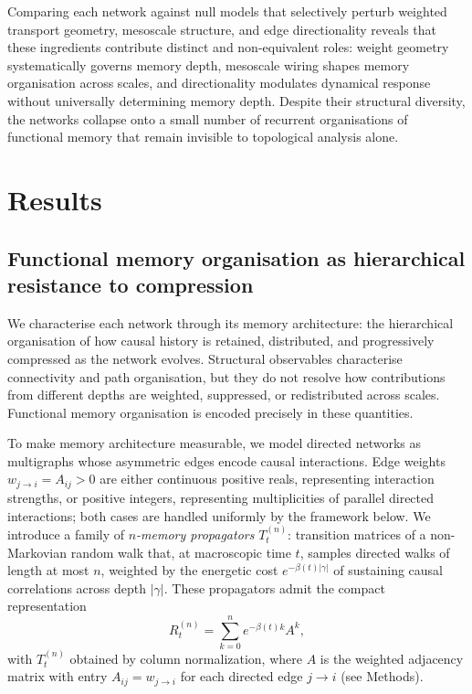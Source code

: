 \documentclass[aps,superscriptaddress,11pt]{revtex4-2}
\newcommand{\Rn}{R^{(n)}_t}
\newcommand{\Tn}{T^{(n)}_t}
\theoremstyle{definition}
\theoremstyle{plain}
\begin{document}
Comparing each network against null models that selectively perturb
weighted transport geometry, mesoscale structure, and edge directionality
reveals that these ingredients contribute distinct and non-equivalent
roles: weight geometry systematically governs memory depth, mesoscale
wiring shapes memory organisation across scales, and directionality
modulates dynamical response without universally determining memory depth.
Despite their structural diversity, the networks collapse onto a small
number of recurrent organisations of functional memory that remain
invisible to topological analysis alone.




\section{Results}
\subsection{Functional memory organisation as hierarchical resistance to compression}


We characterise each network through its memory architecture: the
hierarchical organisation of how causal history is retained, distributed,
and progressively compressed as the network evolves. Structural observables 
characterise connectivity and path organisation, but
they do not resolve how contributions from different depths are weighted,
suppressed, or redistributed across scales. Functional memory organisation is 
encoded precisely in these quantities.

To make memory architecture measurable, we model directed networks as
multigraphs whose asymmetric edges encode causal interactions.  Edge
weights $w_{j\to i} = A_{ij} > 0$ are either continuous positive reals,
representing interaction strengths, or positive integers, representing
multiplicities of parallel directed interactions; both cases are handled
uniformly by the framework below.  We introduce a family of
\emph{$n$-memory propagators} $\Tn$: transition matrices of a
non-Markovian random walk that, at macroscopic time $t$, samples
directed walks of length at most $n$, weighted by the energetic cost
$e^{-\beta(t)|\gamma|}$ of sustaining causal correlations across depth
$|\gamma|$. These propagators admit the compact representation
\begin{equation}
  \Rn = \sum_{k=0}^{n} e^{-\beta(t)k} A^k,
  \label{eq:resolvent_finite}
\end{equation}
with $\Tn$ obtained by column normalization, where $A$ is the
weighted adjacency matrix with entry $A_{ij} = w_{j\to i}$ for each
directed edge $j\to i$ (see Methods).
\end{document}
